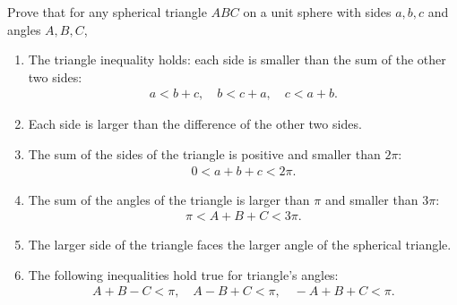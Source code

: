 \begin{tcolorbox}[title={Spherical Triangle Inequalities}]
    \begin{question}
        Prove that for any spherical triangle $ABC$ on a unit sphere with sides $a,b,c$ and angles $A,B,C$,
        \begin{enumerate}
            \item The triangle inequality holds: each side is smaller than the sum of the other two sides: 
            \begin{align*}
                a<b+c, \quad b<c+a, \quad c<a+b.
            \end{align*}
            \item Each side is larger than the difference of the other two sides.
            \item The sum of the sides of the triangle is positive and smaller than $2\pi$:
            \begin{align*}
                0<a+b+c<2\pi.
            \end{align*}
            \item The sum of the angles of the triangle is larger than $\pi$ and smaller than $3\pi$:
            \begin{align*}
                \pi<A+B+C<3\pi.
            \end{align*}
            \item The larger side of the triangle faces the larger angle of the spherical triangle.
            \item The following inequalities hold true for triangle's angles:
            \begin{align*}
                A+B-C<\pi,\quad A-B+C<\pi, \quad -A+B+C<\pi.
            \end{align*}
        \end{enumerate}
    \end{question}
\end{tcolorbox}
